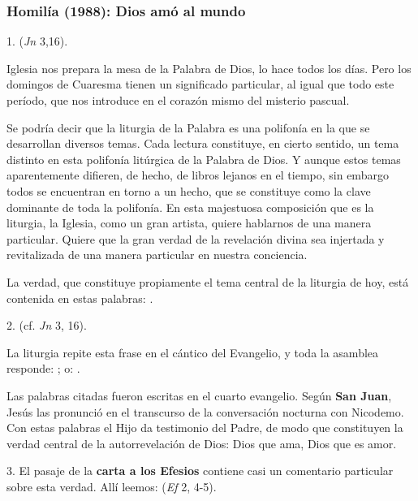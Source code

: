 \newpage
\subsubsection{Homilía (1988): Dios amó al mundo}


\begin{body}
1.  (\textit{Jn} 3,16).

 Iglesia nos prepara la mesa de la Palabra de Dios, lo hace todos los días. Pero los domingos de Cuaresma tienen un significado particular, al igual que todo este período, que nos introduce en el corazón mismo del misterio pascual.

Se podría decir que la liturgia de la Palabra es una polifonía  en la que se desarrollan diversos temas. Cada lectura constituye, en cierto sentido, un tema distinto en esta polifonía litúrgica de la Palabra de Dios. Y aunque estos temas aparentemente difieren, de hecho, de libros lejanos en el tiempo, sin embargo todos se encuentran en torno a un hecho, que se constituye como la clave dominante de toda la polifonía. En esta majestuosa composición que es la liturgia, la Iglesia, como un gran artista, quiere hablarnos de una manera particular. Quiere que la gran verdad de la revelación divina sea injertada y revitalizada de una manera particular en nuestra conciencia.

La verdad, que constituye propiamente el tema central de la liturgia de hoy, está contenida en estas palabras: .

2.  (cf. \textit{Jn} 3, 16).

La liturgia repite esta frase en el cántico del Evangelio, y toda la asamblea responde: ; o: .

Las palabras citadas fueron escritas en el cuarto evangelio. Según \textbf{San Juan}, Jesús las pronunció en el transcurso de la conversación nocturna con Nicodemo. Con estas palabras el Hijo da testimonio del Padre, de modo que constituyen la verdad central de la autorrevelación de Dios: Dios que ama, Dios que es amor.

3. El pasaje de la \textbf{carta a los Efesios} contiene casi un comentario particular sobre esta verdad. Allí leemos:  (\textit{Ef} 2, 4-5).


\end{body}
